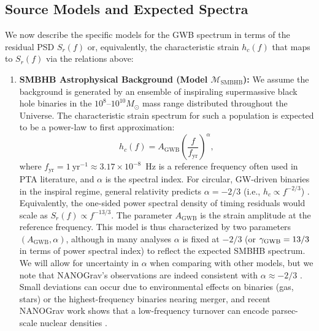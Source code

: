 \documentclass[symmetry,article,submit,pdftex,moreauthors]{Definitions/mdpi}
\begin{document}
\subsection{Source Models and Expected Spectra}\label{subsec:models}
We now describe the specific models for the GWB spectrum in terms of the residual PSD $S_{r}(f)$ or, equivalently, the characteristic strain $h_c(f)$ that maps to $S_{r}(f)$ via the relations above:
\begin{enumerate}
    \item \textbf{SMBHB Astrophysical Background (Model $\mathcal{M}_\mathrm{SMBHB}$):} We assume the background is generated by an ensemble of inspiraling supermassive black hole binaries in the $10^8$--$10^{10}M_\odot$ mass range distributed throughout the Universe. The characteristic strain spectrum for such a population is expected to be a power-law to first approximation: 
    \begin{equation}\label{eq:smbhb_spectrum}
        h_c(f) = A_{\mathrm{GWB}}\left(\frac{f}{f_{\mathrm{yr}}}\right)^{\alpha}\!,
    \end{equation}
        where $f_{\mathrm{yr}} = 1~\text{yr}^{-1} \approx 3.17\times10^{-8}$~Hz is a reference frequency often used in PTA literature, and $\alpha$ is the spectral index. For circular, GW-driven binaries in the inspiral regime, general relativity predicts $\alpha = -2/3$ (i.e., $h_c \propto f^{-2/3}$) \cite{Sesana2013}. Equivalently, the one-sided power spectral density of timing residuals would scale as $S_{r}(f) \propto f^{-13/3}$. The parameter $A_{\mathrm{GWB}}$ is the strain amplitude at the reference frequency. This model is thus characterized by two parameters $(A_{\mathrm{GWB}}, \alpha)$, although in many analyses $\alpha$ is fixed at $-2/3$ (or $\gamma_{\rm GWB}=13/3$ in terms of power spectral index) to reflect the expected SMBHB spectrum. We will allow for uncertainty in $\alpha$ when comparing with other models, but we note that NANOGrav's observations are indeed consistent with $\alpha\approx -2/3$ \cite{NANOGrav15-Evidence}. Small deviations can occur due to environmental effects on binaries (gas, stars) or the highest-frequency binaries nearing merger, and recent NANOGrav work shows that a low-frequency turnover can encode parsec-scale nuclear densities \cite{ChenTomography2024}.


\end{enumerate}
\end{document}
